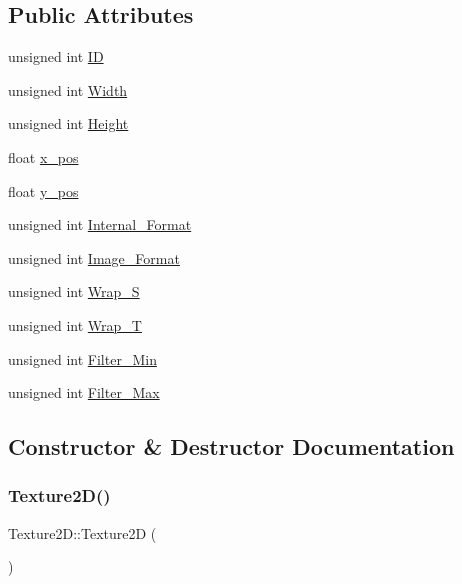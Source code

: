 \subsection*{Public Attributes}
\begin{DoxyCompactItemize}
\item 
unsigned int \hyperlink{classTexture2D_ac5639377a74a227b0b2369c159dc6d46}{ID}
\item 
unsigned int \hyperlink{classTexture2D_a558054990d7e668b9df119713922fa53}{Width}
\item 
unsigned int \hyperlink{classTexture2D_a640768f0078c4c96c7fb80150c548201}{Height}
\item 
float \hyperlink{classTexture2D_a5d7a290a99c99a921e0bbed6e8b529f8}{x\+\_\+pos}
\item 
float \hyperlink{classTexture2D_aeb7e15444821c2bb23d5026ca4430e58}{y\+\_\+pos}
\item 
unsigned int \hyperlink{classTexture2D_a9491c93c156e1a33a4c8d0116aedfffa}{Internal\+\_\+\+Format}
\item 
unsigned int \hyperlink{classTexture2D_a9e4a5f6606148ac84be4c8c096553808}{Image\+\_\+\+Format}
\item 
unsigned int \hyperlink{classTexture2D_a95dc93c0a76a5d30d7b1fade841a58df}{Wrap\+\_\+S}
\item 
unsigned int \hyperlink{classTexture2D_a80e39ea4cf66bbed444cdf135afffb92}{Wrap\+\_\+T}
\item 
unsigned int \hyperlink{classTexture2D_a09545dae0e8b68db570506e3aae8e99b}{Filter\+\_\+\+Min}
\item 
unsigned int \hyperlink{classTexture2D_ac4c49410570a07a5b7fd0ec4a18ab646}{Filter\+\_\+\+Max}
\end{DoxyCompactItemize}


\subsection{Constructor \& Destructor Documentation}
\mbox{\label{classTexture2D_ab62c7c5172a4800b4629cd475147819d}} 
\subsubsection{\texorpdfstring{Texture2\+D()}{Texture2D()}}
{\footnotesize\ttfamily Texture2\+D\+::\+Texture2D (\begin{DoxyParamCaption}{ }\end{DoxyParamCaption})}

